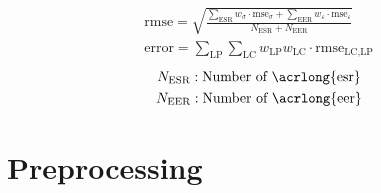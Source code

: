 \begin{gather}
    \label{eq: rmse}
        \text{rmse} = \sqrt{\frac{\displaystyle\sum_{\text{ESR}} w_{\sigma} \cdot \text{mse}_{\sigma} + \displaystyle\sum_{\text{EER}} w_{\varepsilon} \cdot \text{mse}_{\varepsilon}}{N_\text{ESR} + N_\text{EER}}} \\
        \label{eq: error}
    \text{error} = \sum_{\text{LP}} \sum_{\text{LC}} w_{\scriptscriptstyle\text{LP}} w_{\scriptscriptstyle\text{LC}} \cdot \text{rmse}_{\scriptscriptstyle \text{LC}, \text{LP}}
\end{gather}
\begin{gather*}
        N_\text{ESR}: \text{Number of \acrlong{esr}} \\
    N_\text{EER}: \text{Number of \acrlong{eer}}
\end{gather*}




\section{Preprocessing} \label{sec: preprocessing}


